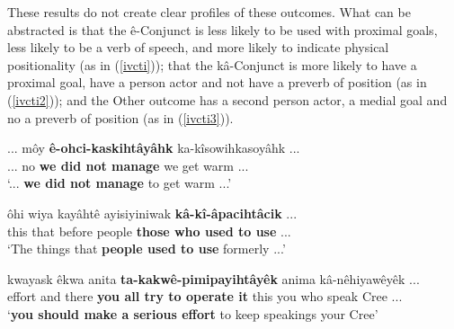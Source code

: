        These results do not create clear profiles of these outcomes. What can be abstracted is that the ê-Conjunct is less likely to be used with proximal goals, less likely to be a verb of speech, and more likely to indicate physical positionality (as in (\ref{ivcti})); that the kâ-Conjunct is more likely to have a proximal goal, have a person actor and not have a preverb of position (as in (\ref{ivcti2})); and the Other outcome has a second person actor, a medial goal and no a preverb of position (as in (\ref{ivcti3})).
        
    \begin{exe}
    \ex
    \gll ... môy \textbf{ê-ohci-kaskihtâyâhk} ka-kîsowihkasoyâhk ...\\
         ... no  {\textbf{we did not manage}} {we get warm} ... \\
    \trans `... \textbf{we did not manage} to get warm ...' \citep[116]{Minde1997kwayask}
    \label{ivcti}
    \end{exe}
        
    \begin{exe}
    \ex
    \gll ôhi wiya kayâhtê ayisiyiniwak \textbf{kâ-kî-âpacihtâcik} ...\\
         this that before people       {\textbf{those who used to use}} ... \\
    \trans `The things that \textbf{people used to use} formerly  ...' \citep[294]{Bearetal1992}
    \label{ivcti2}
    \end{exe}
    
    \begin{exe}
    \ex
    \gll kwayask êkwa anita \textbf{ta-kakwê-pimipayihtâyêk} anima kâ-nêhiyawêyêk ...\\
         effort and there \textbf{{you all try to operate it}} this {you who speak Cree} ... \\
    \trans `\textbf{you should make a serious effort} to keep speakings your Cree' \citep[26]{Whitecalf1993}
    \label{ivcti3}
    \end{exe}
        
        

 \FloatBarrier

